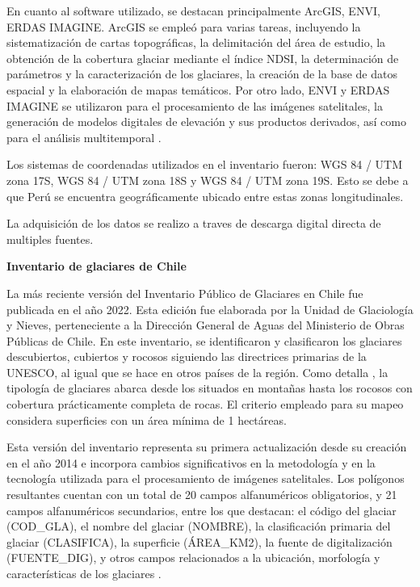 En cuanto al software utilizado, se destacan principalmente ArcGIS, ENVI, ERDAS IMAGINE. ArcGIS se empleó para varias tareas, incluyendo la sistematización de cartas topográficas, la delimitación del área de estudio, la obtención de la cobertura glaciar mediante el índice NDSI, la determinación de parámetros y la caracterización de los glaciares, la creación de la base de datos espacial y la elaboración de mapas temáticos. Por otro lado, ENVI y ERDAS IMAGINE se utilizaron para el procesamiento de las imágenes satelitales, la generación de modelos digitales de elevación y sus productos derivados, así como para el análisis multitemporal \cite{inaigem2017manual}.

Los sistemas de coordenadas utilizados en el inventario fueron: WGS 84 / UTM zona 17S, WGS 84 / UTM zona 18S y WGS 84 / UTM zona 19S. Esto se debe a que Perú se encuentra geográficamente ubicado entre estas zonas longitudinales.

La adquisición de los datos se realizo a traves de descarga digital directa de multiples fuentes. 

\textbf{Inventario de glaciares de Chile}

La más reciente versión del Inventario Público de Glaciares en Chile fue publicada en el año 2022. Esta edición fue elaborada por la Unidad de Glaciología y Nieves, perteneciente a la Dirección General de Aguas del Ministerio de Obras Públicas de Chile. En este inventario, se identificaron y clasificaron los glaciares descubiertos, cubiertos y rocosos siguiendo las directrices primarias de la UNESCO, al igual que se hace en otros países de la región. Como detalla , la tipología de glaciares abarca desde los situados en montañas hasta los rocosos con cobertura prácticamente completa de rocas. El criterio empleado para su mapeo considera superficies con un área mínima de 1 hectáreas.

Esta versión del inventario representa su primera actualización desde su creación en el año 2014 e incorpora cambios significativos en la metodología y en la tecnología utilizada para el procesamiento de imágenes satelitales. Los polígonos resultantes cuentan con un total de 20 campos alfanuméricos obligatorios, y 21 campos alfanuméricos secundarios, entre los que destacan: el código del glaciar (COD\_GLA), el nombre del glaciar (NOMBRE), la clasificación primaria del glaciar (CLASIFICA), la superficie (ÁREA\_KM2), la fuente de digitalización (FUENTE\_DIG), y otros campos relacionados a la ubicación, morfología y características de los glaciares \cite{DGA2022}.

